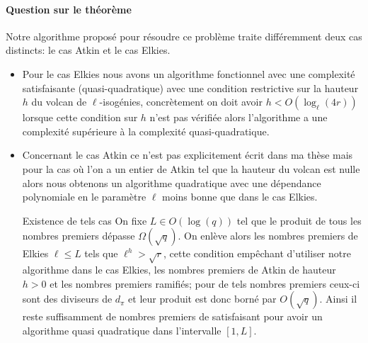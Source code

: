 \documentclass[10pt,a4paper]{article}
\theoremstyle{plain}
\theoremstyle{definition}
\theoremstyle{definition}
\theoremstyle{definition}
\theoremstyle{definition}
\theoremstyle{definition}
\theoremstyle{remark}
\theoremstyle{remark}
\theoremstyle{definition}
\begin{document}
\paragraph{Question sur le théorème}{Notre algorithme proposé pour résoudre ce 
problème traite différemment deux cas distincts: le cas Atkin et le cas Elkies.
\begin{itemize}

\item {} Pour le cas Elkies nous avons un algorithme fonctionnel avec une complexité
satisfaisante (quasi-quadratique) avec une condition restrictive sur la hauteur
$h$ du volcan de $\ell$-isogénies, concrètement on doit avoir $h< O(\log_{\ell}
(4r))$ lorsque cette condition sur $h$ n'est pas vérifiée alors 
l'algorithme a une complexité supérieure à la complexité quasi-quadratique. 
\item {} Concernant le cas Atkin ce n'est pas explicitement écrit dans ma thèse mais 
pour la cas où l'on a un entier de Atkin tel que la hauteur du volcan est 
nulle alors nous obtenons un algorithme quadratique avec une dépendance 
polynomiale en le paramètre $\ell$ moins bonne que dans le cas Elkies. 
\item[Existence de tels cas]On fixe $L \in O(\log(q))$ tel que le produit de tous les nombres premiers 
  dépasse $\Omega(\sqrt{q})$. On enlève alors les nombres premiers 
  de Elkies $\ell \leqslant L$ tels que $\ell^{h} > \sqrt{r}$, cette condition
  empêchant d'utiliser notre algorithme dans le cas Elkies, les nombres premiers de Atkin de hauteur $h>0$ et les nombres premiers ramifiés;
  pour de tels nombres premiers ceux-ci sont des diviseurs de $d_{\pi}$ et leur 
  produit est donc borné par $O(\sqrt{q})$. Ainsi il reste suffisamment de 
  nombres premiers de satisfaisant pour avoir un algorithme quasi quadratique dans 
  l'intervalle  $[1,L]$.

\end{itemize}
}
\end{document}
